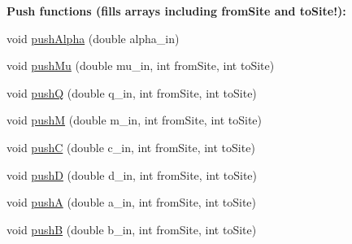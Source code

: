 \begin{Indent}{\bf Push functions (fills arrays including from\+Site and to\+Site!)\+:}\par
\begin{DoxyCompactItemize}
\item 
void \hyperlink{class_p_c_a_1_1_double_well_1_1_param_a33d960f14ffb71535e3bb9fada7aa4fa}{push\+Alpha} (double alpha\+\_\+in)
\item 
void \hyperlink{class_p_c_a_1_1_double_well_1_1_param_a98b94a42625e4994c92da05c5c33999c}{push\+Mu} (double mu\+\_\+in, int from\+Site, int to\+Site)
\item 
void \hyperlink{class_p_c_a_1_1_double_well_1_1_param_a7ba9731477b3baadab67a4f8a48d2ed3}{pushQ} (double q\+\_\+in, int from\+Site, int to\+Site)
\item 
void \hyperlink{class_p_c_a_1_1_double_well_1_1_param_a27949d3412e3f75abb82293faa2c11d4}{pushM} (double m\+\_\+in, int from\+Site, int to\+Site)
\item 
void \hyperlink{class_p_c_a_1_1_double_well_1_1_param_aedf09fe351143731e707c39beea02cff}{pushC} (double c\+\_\+in, int from\+Site, int to\+Site)
\item 
void \hyperlink{class_p_c_a_1_1_double_well_1_1_param_aae4addc9ff6ffe5f7e5e175a57b345ef}{pushD} (double d\+\_\+in, int from\+Site, int to\+Site)
\item 
void \hyperlink{class_p_c_a_1_1_double_well_1_1_param_acf6d26642f3b90c4e9db9e3ef7db81f7}{pushA} (double a\+\_\+in, int from\+Site, int to\+Site)
\item 
void \hyperlink{class_p_c_a_1_1_double_well_1_1_param_a23baa2d632f7ea0e3327ea8e106f551f}{pushB} (double b\+\_\+in, int from\+Site, int to\+Site)
\end{DoxyCompactItemize}
\end{Indent}
